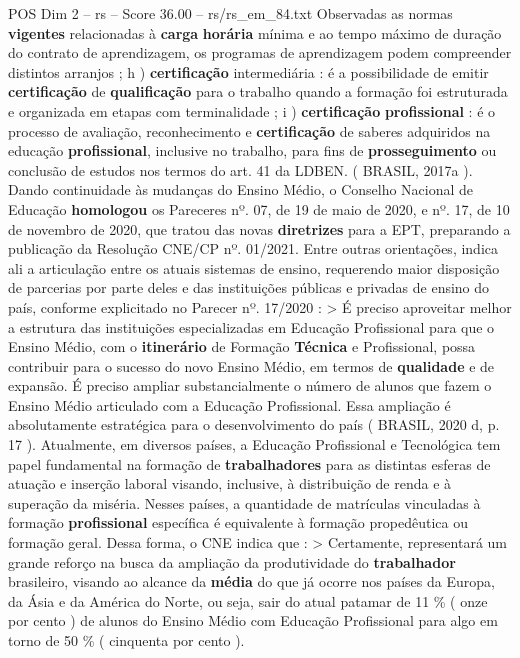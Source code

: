 \begin{textsample}{POS Dim 2 – rs – Score 36.00 – rs/rs\_em\_84.txt}
Observadas as normas \textbf{vigentes} relacionadas à \textbf{carga} \textbf{horária} mínima e ao tempo máximo de duração do contrato de aprendizagem, os programas de aprendizagem podem compreender distintos arranjos ; h ) \textbf{certificação} intermediária : é a possibilidade de emitir \textbf{certificação} de \textbf{qualificação} para o trabalho quando a formação foi estruturada e organizada em etapas com terminalidade ; i ) \textbf{certificação} \textbf{profissional} : é o processo de avaliação, reconhecimento e \textbf{certificação} de saberes adquiridos na educação \textbf{profissional}, inclusive no trabalho, para fins de \textbf{prosseguimento} ou conclusão de estudos nos termos do art. 41 da LDBEN. ( BRASIL, 2017a ).
Dando continuidade às mudanças do Ensino Médio, o Conselho Nacional de Educação \textbf{homologou} os Pareceres nº. 07, de 19 de maio de 2020, e nº. 17, de 10 de novembro de 2020, que tratou das novas \textbf{diretrizes} para a EPT, preparando a publicação da Resolução CNE/CP nº. 01/2021.
Entre outras orientações, indica ali a articulação entre os atuais sistemas de ensino, requerendo maior disposição de parcerias por parte deles e das instituições públicas e privadas de ensino do país, conforme explicitado no Parecer nº. 17/2020 : > É preciso aproveitar melhor a estrutura das instituições especializadas em Educação Profissional para que o Ensino Médio, com o \textbf{itinerário} de Formação \textbf{Técnica} e Profissional, possa contribuir para o sucesso do novo Ensino Médio, em termos de \textbf{qualidade} e de expansão.
É preciso ampliar substancialmente o número de alunos que fazem o Ensino Médio articulado com a Educação Profissional.
Essa ampliação é absolutamente estratégica para o desenvolvimento do país ( BRASIL, 2020 d, p. 17 ).
Atualmente, em diversos países, a Educação Profissional e Tecnológica tem papel fundamental na formação de \textbf{trabalhadores} para as distintas esferas de atuação e inserção laboral visando, inclusive, à distribuição de renda e à superação da miséria.
Nesses países, a quantidade de matrículas vinculadas à formação \textbf{profissional} específica é equivalente à formação propedêutica ou formação geral.
Dessa forma, o CNE indica que : > Certamente, representará um grande reforço na busca da ampliação da produtividade do \textbf{trabalhador} brasileiro, visando ao alcance da \textbf{média} do que já ocorre nos países da Europa, da Ásia e da América do Norte, ou seja, sair do atual patamar de 11 \% ( onze por cento ) de alunos do Ensino Médio com Educação Profissional para algo em torno de 50 \% ( cinquenta por cento ).

\end{textsample}
